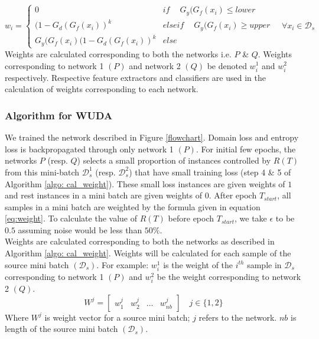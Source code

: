 \begin{equation}
\label{eq:weight}
                w_{i} = \begin{cases}
		            0 & if\ \quad G_y(G_f(x_i) \le lower \\
		            (1 - G_d(G_f(x_i))^k & elseif\ \quad G_y(G_f(x_i) \ge upper \\
		            G_y(G_f(x_i)(1 - G_d(G_f(x_i))^k & else\ 
		            \end{cases} \quad \forall x_i \in \mathcal{D}_s
\end{equation}
Weights are calculated corresponding to both the networks i.e. $P$ \& $Q$. Weights corresponding to network 1 $(P)$ and network 2 $(Q)$ be denoted $w_{i}^1$ and $w_{i}^2$ respectively. Respective feature extractors and classifiers are used in the calculation of weights corresponding to each network.  

\subsubsection{Algorithm for WUDA}
We trained the network described in Figure \ref{flowchart}. Domain loss and entropy loss is backpropagated through only network 1 $(P)$. For initial few epochs, the networks $P$ (resp. $Q$) selects a small proportion of instances controlled by $R(T)$ from this mini-batch $\mathcal{D}_{s}^1$ (resp. $\mathcal{D}_{s}^2$) that have small training loss (step 4 \& 5 of Algorithm \ref{algo: cal_weight}). These small loss instances are given weights of $1$ and rest instances in a mini batch are given weights of $0$. After epoch $T_{start}$, all samples in a mini batch are weighted by the formula given in equation \ref{eq:weight}. To calculate the value of $R(T)$ before epoch $T_{start}$, we take $\epsilon$ to be $0.5$ assuming noise would be less than $50\%$.\\
Weights are calculated corresponding to both the networks as described in Algorithm \ref{algo: cal_weight}. Weights will be calculated for each sample of the source mini batch $(\mathcal{D}_s)$. For example: $w_{i}^1$ is the weight of the $i^{th}$ sample in $\mathcal{D}_s$ corresponding to network 1 $(P)$ and $w_{i}^2$ be the weight corresponding to network 2 $(Q)$.
\begin{equation}
    W^j = \begin{bmatrix} w_{1}^j & w_{2}^j & \dots & w_{nb}^j \end{bmatrix}  \quad j \in \{1, 2\}
\end{equation}
Where $W^j$ is weight vector for a source mini batch; $j$ refers to the network. $nb$ is length of the source mini batch $(\mathcal{D}_s)$.

